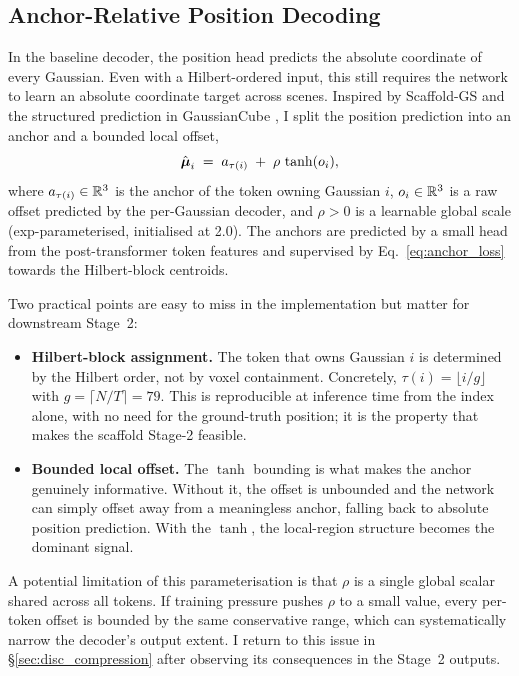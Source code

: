 \subsection{Anchor-Relative Position Decoding}
\label{sec:method_anchor}

In the baseline decoder, the position head predicts the absolute coordinate of every Gaussian. Even with a Hilbert-ordered input, this still requires the network to learn an absolute coordinate target across scenes. Inspired by Scaffold-GS \citep{lu2024scaffold} and the structured prediction in GaussianCube \citep{zhang2024gaussiancube}, I split the position prediction into an anchor and a bounded local offset,
\begin{equation}
\hat{\boldsymbol{\mu}}_i \;=\; a_{\tau(i)} \;+\; \rho \,\tanh(o_i),
\label{eq:anchor_relative}
\end{equation}
where $a_{\tau(i)} \in \mathbb{R}^3$ is the anchor of the token owning Gaussian $i$, $o_i \in \mathbb{R}^3$ is a raw offset predicted by the per-Gaussian decoder, and $\rho > 0$ is a learnable global scale (exp-parameterised, initialised at 2.0). The anchors are predicted by a small head from the post-transformer token features and supervised by Eq.~\eqref{eq:anchor_loss} towards the Hilbert-block centroids.

Two practical points are easy to miss in the implementation but matter for downstream Stage~2:
\begin{itemize}
\item \textbf{Hilbert-block assignment.} The token that owns Gaussian $i$ is determined by the Hilbert order, not by voxel containment. Concretely, $\tau(i) = \lfloor i/g \rfloor$ with $g = \lceil N/T \rceil = 79$. This is reproducible at inference time from the index alone, with no need for the ground-truth position; it is the property that makes the scaffold Stage-2 feasible.
\item \textbf{Bounded local offset.} The $\tanh$ bounding is what makes the anchor genuinely informative. Without it, the offset is unbounded and the network can simply offset away from a meaningless anchor, falling back to absolute position prediction. With the $\tanh$, the local-region structure becomes the dominant signal.
\end{itemize}

A potential limitation of this parameterisation is that $\rho$ is a single global scalar shared across all tokens. If training pressure pushes $\rho$ to a small value, every per-token offset is bounded by the same conservative range, which can systematically narrow the decoder's output extent. I return to this issue in \S\ref{sec:disc_compression} after observing its consequences in the Stage~2 outputs.

